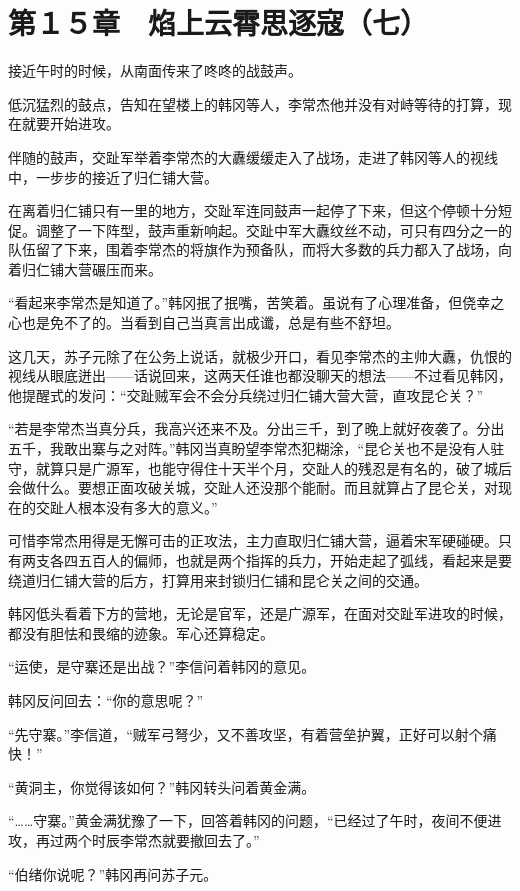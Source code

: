 \section{第１５章　焰上云霄思逐寇（七）}

接近午时的时候，从南面传来了咚咚的战鼓声。

低沉猛烈的鼓点，告知在望楼上的韩冈等人，李常杰他并没有对峙等待的打算，现在就要开始进攻。

伴随的鼓声，交趾军举着李常杰的大纛缓缓走入了战场，走进了韩冈等人的视线中，一步步的接近了归仁铺大营。

在离着归仁铺只有一里的地方，交趾军连同鼓声一起停了下来，但这个停顿十分短促。调整了一下阵型，鼓声重新响起。交趾中军大纛纹丝不动，可只有四分之一的队伍留了下来，围着李常杰的将旗作为预备队，而将大多数的兵力都入了战场，向着归仁铺大营碾压而来。

“看起来李常杰是知道了。”韩冈抿了抿嘴，苦笑着。虽说有了心理准备，但侥幸之心也是免不了的。当看到自己当真言出成谶，总是有些不舒坦。

这几天，苏子元除了在公务上说话，就极少开口，看见李常杰的主帅大纛，仇恨的视线从眼底迸出——话说回来，这两天任谁也都没聊天的想法——不过看见韩冈，他提醒式的发问：“交趾贼军会不会分兵绕过归仁铺大营大营，直攻昆仑关？”

“若是李常杰当真分兵，我高兴还来不及。分出三千，到了晚上就好夜袭了。分出五千，我敢出寨与之对阵。”韩冈当真盼望李常杰犯糊涂，“昆仑关也不是没有人驻守，就算只是广源军，也能守得住十天半个月，交趾人的残忍是有名的，破了城后会做什么。要想正面攻破关城，交趾人还没那个能耐。而且就算占了昆仑关，对现在的交趾人根本没有多大的意义。”

可惜李常杰用得是无懈可击的正攻法，主力直取归仁铺大营，逼着宋军硬碰硬。只有两支各四五百人的偏师，也就是两个指挥的兵力，开始走起了弧线，看起来是要绕道归仁铺大营的后方，打算用来封锁归仁铺和昆仑关之间的交通。

韩冈低头看着下方的营地，无论是官军，还是广源军，在面对交趾军进攻的时候，都没有胆怯和畏缩的迹象。军心还算稳定。

“运使，是守寨还是出战？”李信问着韩冈的意见。

韩冈反问回去：“你的意思呢？”

“先守寨。”李信道，“贼军弓弩少，又不善攻坚，有着营垒护翼，正好可以射个痛快！”

“黄洞主，你觉得该如何？”韩冈转头问着黄金满。

“……守寨。”黄金满犹豫了一下，回答着韩冈的问题，“已经过了午时，夜间不便进攻，再过两个时辰李常杰就要撤回去了。”

“伯绪你说呢？”韩冈再问苏子元。

